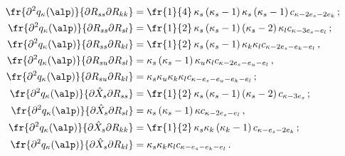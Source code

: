         \begin{align*}


    \fr{\partial^2 q_\kappa  (\alp)}{\partial R_{ss} \partial R_{kk}}&= \fr{1}{4}\,

    \kappa_s\left(\kappa_s -1\right)\kappa_s \left(\kappa_s -1\right)  

    c_{\kappa- 2e_s- 2 e_k}\,;

\\

    \fr{\partial^2 q_\kappa (\alp)}{\partial R_{ss} \partial R_{sl}}&= \fr{1}{2}\,

    \kappa_s\left(\kappa_s -1\right) \left(\kappa_s -2\right) \kappa_l 

    c_{\kappa- 3e_s-     e_l}\,;

\\

    \fr{\partial^2 q_\kappa (\alp)}{\partial R_{ss} \partial R_{kl}}&= \fr{1}{2}\,

    \kappa_s\left(\kappa_s -1\right) \kappa_k \kappa_l c_{\kappa- 2e_s-e_k-     e_l}\,,

\\

    \fr{\partial^2 q_\kappa (\alp)}{\partial R_{su} \partial R_{sl}}&= 

    \kappa_s\left(\kappa_s -1\right)  \kappa_u \kappa_l c_{\kappa- 2e_s-e_u-  e_l}\,,

\\

    \fr{\partial^2 q_\kappa (\alp)}{\partial R_{su} \partial R_{kl}}&=

    \kappa_s\kappa_u \kappa_k\kappa_l c_{\kappa-  e_s-e_u-e_k-e_l}\,;

\\

    \fr{\partial^2 q_\kappa     (\alp)}{\partial \hat X_s \partial R_{ss}}&= 

    \fr{1}{2}\,\kappa_s\left(\kappa_s -1\right) \left(\kappa_s -2\right) c_{\kappa-

    3e_s}\,;

\\

    \fr{\partial^2 q_\kappa     (\alp)}{\partial \hat X_s \partial R_{sl}}&= 

    \kappa_s\left(\kappa_s -1\right)   \kappa c_{\kappa- 2e_s- e_l}\,,

\\

    \fr{\partial^2 q_\kappa     (\alp)}{\partial \hat X_s \partial R_{kk}}&= 

    \fr{1}{2}\,\kappa_s\kappa_k \left(\kappa_k -1\right) c_{\kappa- e_s-2

    e_k}\,;

\\

    \fr{\partial^2 q_\kappa (\alp)}{\partial \hat X_s \partial R_{kl}}&= 

    \kappa_s\kappa_k     \kappa_l c_{\kappa- e_s-e_k-  e_l}\,.


    \end{align*}
